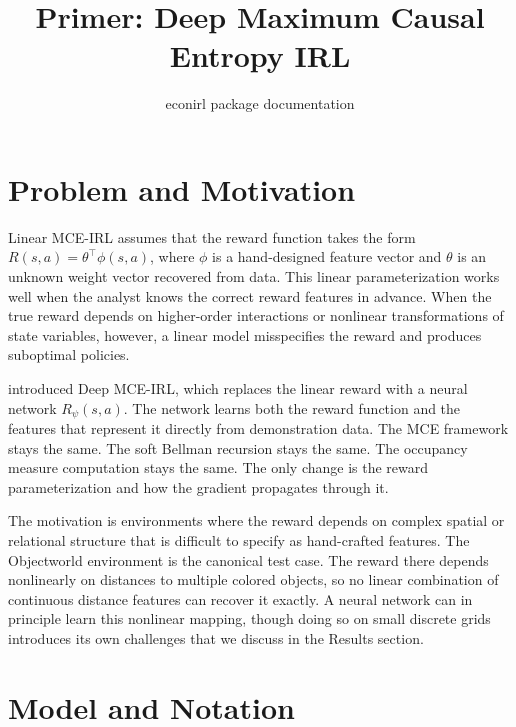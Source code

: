 \documentclass[10pt]{article}
\title{Primer: Deep Maximum Causal Entropy IRL}
\author{econirl package documentation}
\date{}
\begin{document}
\maketitle


\section{Problem and Motivation}

Linear MCE-IRL \citep{ziebart2010} assumes that the reward function takes the form $R(s,a) = \theta^\top\phi(s,a)$, where $\phi$ is a hand-designed feature vector and $\theta$ is an unknown weight vector recovered from data. This linear parameterization works well when the analyst knows the correct reward features in advance. When the true reward depends on higher-order interactions or nonlinear transformations of state variables, however, a linear model misspecifies the reward and produces suboptimal policies.

\citet{wulfmeier2016} introduced Deep MCE-IRL, which replaces the linear reward with a neural network $R_\psi(s,a)$. The network learns both the reward function and the features that represent it directly from demonstration data. The MCE framework stays the same. The soft Bellman recursion stays the same. The occupancy measure computation stays the same. The only change is the reward parameterization and how the gradient propagates through it.

The motivation is environments where the reward depends on complex spatial or relational structure that is difficult to specify as hand-crafted features. The Objectworld environment \citep{wulfmeier2016} is the canonical test case. The reward there depends nonlinearly on distances to multiple colored objects, so no linear combination of continuous distance features can recover it exactly. A neural network can in principle learn this nonlinear mapping, though doing so on small discrete grids introduces its own challenges that we discuss in the Results section.


\section{Model and Notation}

\commonnotation
\end{document}
